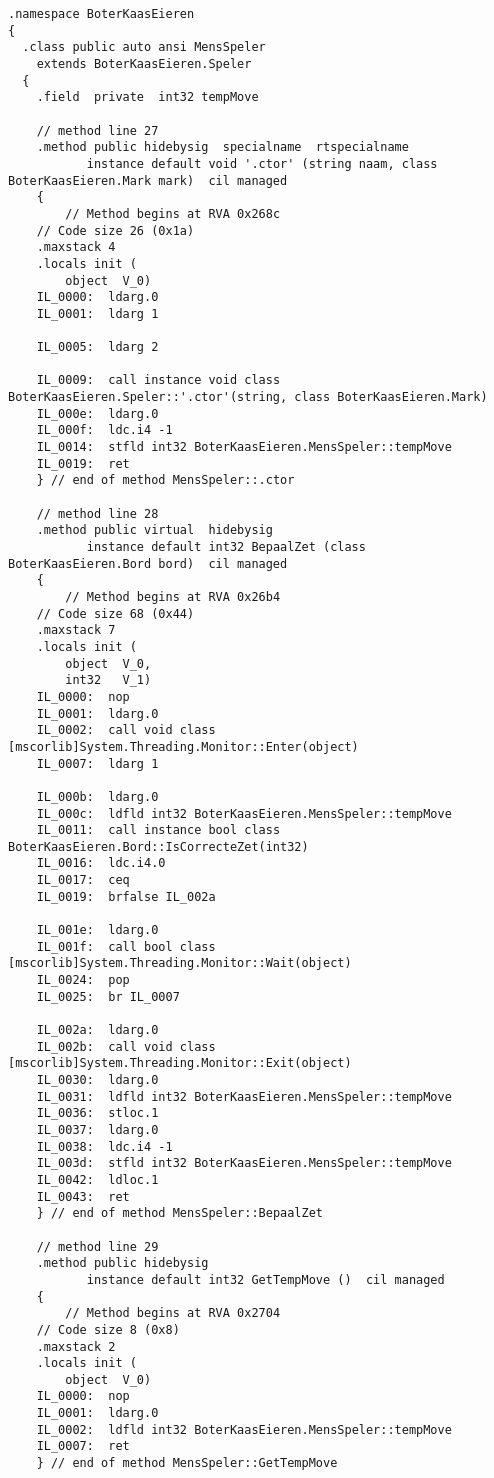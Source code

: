 \begin{lstlisting}
.namespace BoterKaasEieren
{
  .class public auto ansi MensSpeler
  	extends BoterKaasEieren.Speler
  {
    .field  private  int32 tempMove

    // method line 27
    .method public hidebysig  specialname  rtspecialname 
           instance default void '.ctor' (string naam, class BoterKaasEieren.Mark mark)  cil managed 
    {
        // Method begins at RVA 0x268c
	// Code size 26 (0x1a)
	.maxstack 4
	.locals init (
		object	V_0)
	IL_0000:  ldarg.0 
	IL_0001:  ldarg 1

	IL_0005:  ldarg 2

	IL_0009:  call instance void class BoterKaasEieren.Speler::'.ctor'(string, class BoterKaasEieren.Mark)
	IL_000e:  ldarg.0 
	IL_000f:  ldc.i4 -1
	IL_0014:  stfld int32 BoterKaasEieren.MensSpeler::tempMove
	IL_0019:  ret 
    } // end of method MensSpeler::.ctor

    // method line 28
    .method public virtual  hidebysig 
           instance default int32 BepaalZet (class BoterKaasEieren.Bord bord)  cil managed 
    {
        // Method begins at RVA 0x26b4
	// Code size 68 (0x44)
	.maxstack 7
	.locals init (
		object	V_0,
		int32	V_1)
	IL_0000:  nop 
	IL_0001:  ldarg.0 
	IL_0002:  call void class [mscorlib]System.Threading.Monitor::Enter(object)
	IL_0007:  ldarg 1

	IL_000b:  ldarg.0 
	IL_000c:  ldfld int32 BoterKaasEieren.MensSpeler::tempMove
	IL_0011:  call instance bool class BoterKaasEieren.Bord::IsCorrecteZet(int32)
	IL_0016:  ldc.i4.0 
	IL_0017:  ceq 
	IL_0019:  brfalse IL_002a

	IL_001e:  ldarg.0 
	IL_001f:  call bool class [mscorlib]System.Threading.Monitor::Wait(object)
	IL_0024:  pop 
	IL_0025:  br IL_0007

	IL_002a:  ldarg.0 
	IL_002b:  call void class [mscorlib]System.Threading.Monitor::Exit(object)
	IL_0030:  ldarg.0 
	IL_0031:  ldfld int32 BoterKaasEieren.MensSpeler::tempMove
	IL_0036:  stloc.1 
	IL_0037:  ldarg.0 
	IL_0038:  ldc.i4 -1
	IL_003d:  stfld int32 BoterKaasEieren.MensSpeler::tempMove
	IL_0042:  ldloc.1 
	IL_0043:  ret 
    } // end of method MensSpeler::BepaalZet

    // method line 29
    .method public hidebysig 
           instance default int32 GetTempMove ()  cil managed 
    {
        // Method begins at RVA 0x2704
	// Code size 8 (0x8)
	.maxstack 2
	.locals init (
		object	V_0)
	IL_0000:  nop 
	IL_0001:  ldarg.0 
	IL_0002:  ldfld int32 BoterKaasEieren.MensSpeler::tempMove
	IL_0007:  ret 
    } // end of method MensSpeler::GetTempMove


\end{lstlisting}
